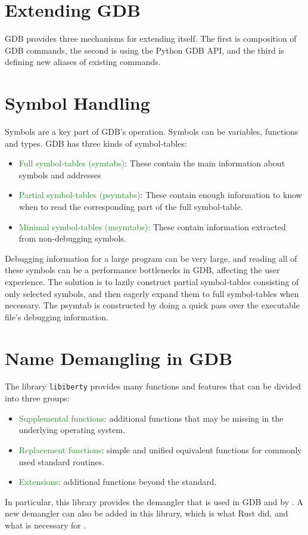 \section{Extending GDB}
GDB provides three mechanisms for extending itself. The first is
composition of GDB commands, the second is using the Python GDB API, and the third is defining new aliases of existing commands.

\section{Symbol Handling}
Symbols are a key part of GDB's operation. Symbols can be variables, functions and
types. GDB has three kinds of symbol-tables:
\begin{itemize}
    \item \textcolor{ForestGreen}{Full symbol-tables (symtabs)}: These contain the main information
        about symbols and addresses
    \item \textcolor{ForestGreen} {Partial symbol-tables (psymtabs)}: These contain enough information to
        know when to read the corresponding part of the full symbol-table.
    \item \textcolor{ForestGreen}{Minimal symbol-tables (msymtabs)}: These
        contain information extracted from non-debugging symbols.
\end{itemize}

Debugging information for a large program can be very large, and reading all of
these symbols can be a performance bottlenecks in GDB, affecting the user
experience. The solution is to lazily construct partial symbol-tables consisting of
only selected symbols, and then eagerly expand them to full symbol-tables when
necessary.
The psymtab is constructed by doing a quick pass over the executable file's
debugging information.

\section{Name Demangling in GDB}
The library \verb|libiberty| provides many functions and features that can be
divided into three groups:
\begin{itemize}
    \item \textcolor{ForestGreen}{Supplemental functions}: additional functions
        that may be missing in
        the underlying operating system.
    \item \textcolor{ForestGreen}{Replacement functions}: simple and unified equivalent functions for
        commonly used standard routines.
    \item \textcolor{ForestGreen}{Extensions}: additional functions beyond the standard.
\end{itemize}

In particular, this library provides the \CCS demangler that is used in GDB and
by \uCPP. A new
demangler can also be added in this library, which is what Rust did, and what
is necessary for \CFA.

